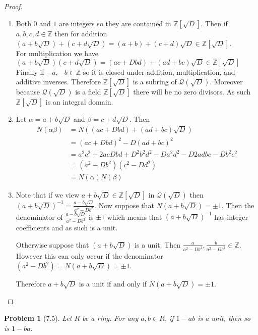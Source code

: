 \documentclass[10pt]{article}
\newcommand{\sk}{\vskip 10mm}
\newcommand{\bb}[1]{\mathbb{#1}}
\theoremstyle{plain}
\newtheorem{problem}{Problem}
\theoremstyle{remark}
\begin{document}
\begin{proof}
  \begin{enumerate}
  \item Both $0$ and $1$ are integers so they are contained in $\bb{Z}[\sqrt{D}]$.
    Then if $a,b,c,d\in \bb{Z}$ then for addition
    $(a+b\sqrt{D})+(c+d\sqrt{D})=(a+b)+(c+d)\sqrt{D}\in\bb{Z}[\sqrt{D}]$.\\
    For multiplication we have
    $(a+b\sqrt{D})(c+d\sqrt{D})=(ac+Dbd)+(ad+bc)\sqrt{D}\in\bb{Z}[\sqrt{D}]$
    Finally if $-a,-b\in\bb{Z}$ so it is closed under addition, multiplication,
    and additive inverses. Therefore $\bb{Z}[\sqrt{D}]$ is a subring of
    $\mathcal{Q}(\sqrt{D})$. Moreover because $\mathcal{Q}(\sqrt{D})$ is a field
    $\bb{Z}[\sqrt{D}]$ there will be no zero divisors. As such $\bb{Z}[\sqrt{D}]$
    is an integral domain.
  \item Let $\alpha=a+b\sqrt{D}$ and $\beta=c+d\sqrt{D}$. Then
    \begin{align*}
      N(\alpha\beta)&=N((ac+Dbd)+(ad+bc)\sqrt{D})\\
           &=(ac+Dbd)^2-D(ad+bc)^2\\
           &=a^2c^2+2acDbd+D^2b^2d^2-Da^2d^2-D2adbc-Db^2c^2\\
           &=(a^2-Db^2)(c^2-Dd^2)\\
           &=N(\alpha)N(\beta)
    \end{align*}
  \item Note that if we view $a+b\sqrt{D}\in\bb{Z}[\sqrt{D}]$ in $\mathcal{Q}(\sqrt{D})$
    then $(a+b\sqrt{D})^{-1}=\frac{a-b\sqrt{D}}{a^2-Db^2}$. Now suppose that
    $N(a+b\sqrt{D})=\pm 1$. Then the denominator of $\frac{a-b\sqrt{D}}{a^2-Db^2}$
    is $\pm 1$ which means that $(a+b\sqrt{D})^{-1}$  has integer coefficients and
    as such is a unit.

    Otherwise suppose that $(a+b\sqrt{D})$ is a unit. Then
    $\frac{a}{a^2-Db^2},\frac{b}{a^2-Db^2}\in\bb{Z}$. However this can only
    occur if the denominator $(a^2-Db^2)=N(a+b\sqrt{D})=\pm 1$.

    Therefore $a+b\sqrt{D}$ is a unit if and only if $N(a+b\sqrt{D})=\pm 1$.
  \end{enumerate}
\end{proof}

\sk

\begin{problem}[7.5]
  Let $R$ be a ring. For any $a,b\in R$, if $1-ab$ is a unit, then so is $1-ba$.
\end{problem}
\end{document}
